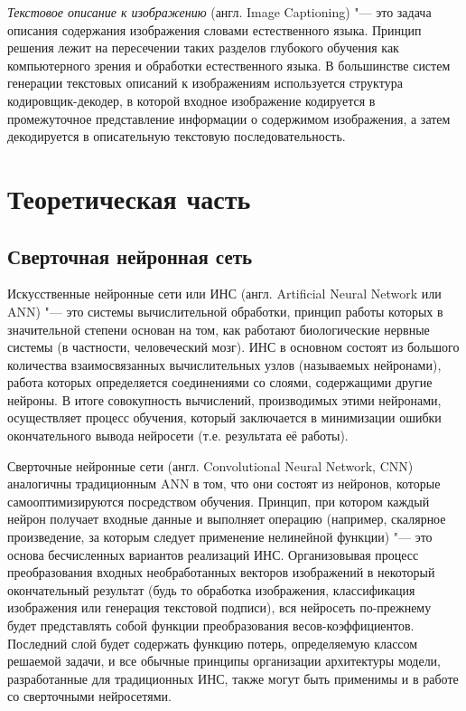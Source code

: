 \documentclass[bachelor, och, coursework]{SCWorks}
\begin{document}
    \textit{Текстовое описание к изображению} (англ. Image Captioning) "--- это задача описания содержания изображения
    словами естественного языка. Принцип решения лежит на пересечении таких разделов глубокого обучения как
    компьютерного зрения и обработки естественного языка. В большинстве систем генерации текстовых описаний к
    изображениям используется структура кодировщик-декодер, в которой входное изображение кодируется в промежуточное
    представление информации о содержимом изображения, а затем декодируется в описательную текстовую последовательность.

\section{Теоретическая часть}

    \subsection{Сверточная нейронная сеть}

        Искусственные нейронные сети или ИНС (англ. Artificial Neural Network или ANN) "--- это системы вычислительной
        обработки, принцип работы которых в значительной степени основан на том, как работают биологические нервные
        системы (в частности, человеческий мозг). ИНС в основном состоят из большого количества взаимосвязанных
        вычислительных узлов (называемых нейронами), работа которых определяется соединениями со слоями, содержащими
        другие нейроны. В итоге совокупность вычислений, производимых этими нейронами, осуществляет процесс обучения,
        который заключается в минимизации ошибки окончательного вывода нейросети (т.е. результата её работы).
        
        Сверточные нейронные сети (англ. Convolutional Neural Network, CNN) аналогичны традиционным ANN в том, что они
        состоят из нейронов, которые самооптимизируются посредством обучения. Принцип, при котором каждый нейрон
        получает входные данные и выполняет операцию (например, скалярное произведение, за которым следует применение
        нелинейной функции) "--- это основа бесчисленных вариантов реализаций ИНС. Организовывая процесс преобразования
        входных необработанных векторов изображений в некоторый окончательный результат (будь то обработка изображения,
        классификация изображения или генерация текстовой подписи), вся нейросеть по-прежнему будет представлять собой
        функции преобразования весов-коэффициентов. Последний слой будет содержать функцию потерь, определяемую классом
        решаемой задачи, и все обычные принципы организации архитектуры модели, разработанные для традиционных ИНС,
        также могут быть применимы и в работе со сверточными нейросетями. 
\end{document}
